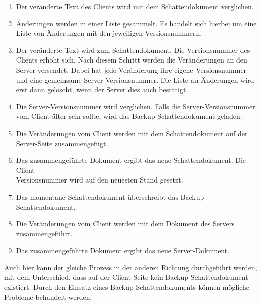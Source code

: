 \begin{enumerate}
	\item Der veränderte Text des Clients wird mit dem Schattendokument verglichen.
	\item Änderungen werden in einer Liste gesammelt. Es handelt sich hierbei um eine Liste von Änderungen mit den jeweiligen Versionsnummern.
	\item Der veränderte Text wird zum Schattendokument. Die Versionsnummer des Clients erhöht sich. Nach diesem Schritt werden die Veränderungen an den Server versendet. Dabei hat jede Veränderung ihre eigene Versionsnummer und eine gemeinsame Server-Versionsnummer. Die Liste an Änderungen wird erst dann gelöscht, wenn der Server dies auch bestätigt.
	\item Die Server-Versionsnummer wird verglichen. Falls die Server-Versionsnummer vom Client älter sein sollte, wird das Backup-Schattendokument geladen.
	\item Die Veränderungen vom Client werden mit dem Schattendokument auf der Server-Seite zusammengefügt.
	\item Das zusammengeführte Dokument ergibt das neue Schattendokument. Die Client-\\Versionsnummer wird auf den neuesten Stand gesetzt.
	\item Das momentane Schattendokument überschreibt das Backup-Schattendokument.
	\item Die Veränderungen vom Client werden mit dem Dokument des Servers zusammengeführt.
	\item Das zusammengeführte Dokument ergibt das neue Server-Dokument.
\end{enumerate}

\newpage
Auch hier kann der gleiche Prozess in der anderen Richtung durchgeführt werden, mit dem Unterschied, dass auf der Client-Seite kein Backup-Schattendokument existiert. Durch den Einsatz eines Backup-Schattendokuments können mögliche Probleme behandelt werden:

